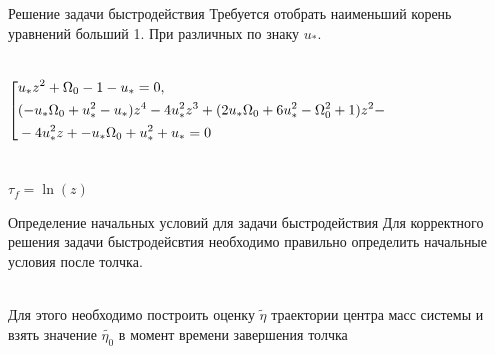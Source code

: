 \documentclass[10pt]{beamer}
\begin{document}
\begin{frame}{Решение задачи быстродействия}
	Требуется отобрать наименьший корень уравнений больший 1. При различных по знаку $u_*$.

		\begin{columns}
			\begin{equation}\label{koshisystem}
				\left[ {\begin{aligned}
					& u_*z^2+\Omega _0-1-u_*=0, \hfill    \\
					& (-u_* \Omega _0+u_*^2-u_*)z^4-4 u_*^2z^3+(2 u_* \Omega _0+6 u_*^2-\Omega _0^2+1)z^2- \hfill \\
					& -4 u_*^2z+-u_* \Omega _0+u_*^2+u_*=0 \hfill    \\
			   \end{aligned}} \right.
			\end{equation}
		\end{columns}
		$\tau_f=\ln(z)$

\end{frame}

\begin{frame}{Определение начальных условий для задачи быстродействия}
	Для корректного решения задачи быстродейсвтия необходимо правильно определить начальные условия после толчка.
	
	\hfill \\
	Для этого необходимо построить оценку $\tilde{\eta}$ траектории центра масс системы
	и взять значение $\tilde{\eta_0}$ в момент времени завершения толчка

\end{frame}
\end{document}
